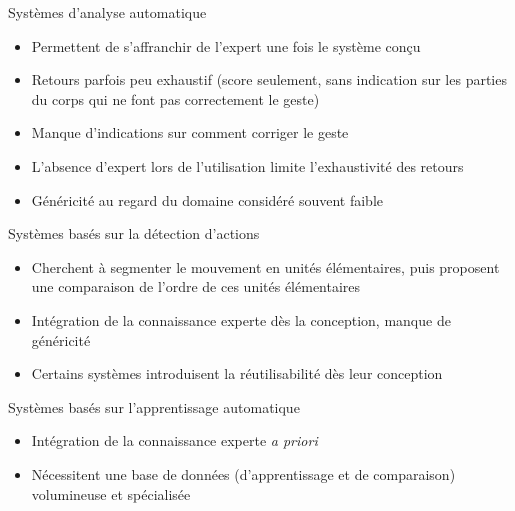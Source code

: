     \begin{frame}{\subsecname}
        \begin{block}{Systèmes d'analyse automatique}
            \begin{itemize}[label=$\bullet$]
                \item Permettent de s'affranchir de l'expert une fois le système conçu
                \item Retours parfois peu exhaustif (score seulement, sans indication sur les parties du corps qui ne font pas correctement le geste)
                \item Manque d'indications sur comment corriger le geste
                \item L'absence d'expert lors de l'utilisation limite l'exhaustivité des retours
                \item Généricité au regard du domaine considéré souvent faible
            \end{itemize}
        \end{block}
        
        \begin{block}{Systèmes basés sur la détection d'actions}
            \begin{itemize}[label=$\bullet$]
                \item Cherchent à segmenter le mouvement en unités élémentaires, puis proposent une comparaison de l'ordre de ces unités élémentaires
                \item Intégration de la connaissance experte dès la conception, manque de généricité
                \item Certains systèmes introduisent la réutilisabilité dès leur conception 
            \end{itemize}
        \end{block}
        
        \begin{block}{Systèmes basés sur l'apprentissage automatique}
            \begin{itemize}[label=$\bullet$]
                \item Intégration de la connaissance experte \textit{a priori}
                \item Nécessitent une base de données (d'apprentissage et de comparaison) volumineuse et spécialisée
            \end{itemize}
        \end{block}
    

\end{frame}
